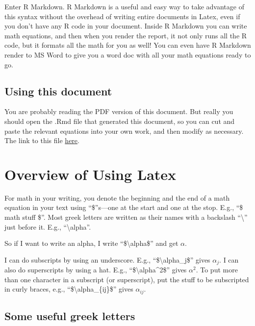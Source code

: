\documentclass[
  letterpaper,
  DIV=11,
  numbers=noendperiod]{scrreprt}
\begin{document}
Enter R Markdown. R Markdown is a useful and easy way to take advantage
of this syntax without the overhead of writing entire documents in
Latex, even if you don't have any R code in your document. Inside R
Markdown you can write math equations, and then when you render the
report, it not only runs all the R code, but it formats all the math for
you as well! You can even have R Markdown render to MS Word to give you
a word doc with all your math equations ready to go.

\hypertarget{using-this-document}{%
\subsection{Using this document}\label{using-this-document}}

You are probably reading the PDF version of this document. But really
you should open the .Rmd file that generated this document, so you can
cut and paste the relevant equations into your own work, and then modify
as necessary. The link to this file
\href{https://raw.githubusercontent.com/lmiratrix/MLM/main/math_reference.qmd}{here}.

\hypertarget{overview-of-using-latex}{%
\section{Overview of Using Latex}\label{overview-of-using-latex}}

For math in your writing, you denote the beginning and the end of a math
equation in your text using ``\$''s---one at the start and one at the
stop. E.g., ``\$ math stuff \$''. Most greek letters are written as
their names with a backslash ``\textbackslash{}'' just before it. E.g.,
``\textbackslash alpha''.

So if I want to write an alpha, I write ``\$\textbackslash alpha\$'' and
get \(\alpha\).

I can do subscripts by using an underscore. E.g.,
``\$\textbackslash alpha\_j\$'' gives \(\alpha_j\). I can also do
superscripts by using a hat. E.g., ``\$\textbackslash alpha\^{}2\$''
gives \(\alpha^2\). To put more than one character in a subscript (or
superscript), put the stuff to be subscripted in curly braces, e.g.,
``\$\textbackslash alpha\_\{ij\}\$'' gives \(\alpha_{ij}\).

\newpage

\hypertarget{some-useful-greek-letters}{%
\subsection{Some useful greek letters}\label{some-useful-greek-letters}}
\end{document}
